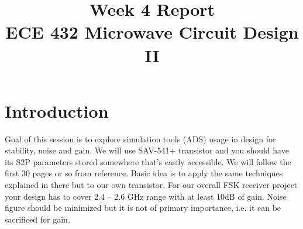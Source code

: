 \documentclass[conference]{IEEEtran}
\begin{document}
\title{Week 4 Report\\ECE 432 Microwave Circuit Design II}
\author{
\and
{}
}
\maketitle
\IEEEpeerreviewmaketitle
\section{Introduction}
Goal of this session is to explore simulation tools (ADS) usage in design for stability, noise and gain. We will use SAV-541+ transistor and you should have its S2P parameters stored somewhere that’s easily accessible. We will follow the first 30 pages or so from reference\cite{payne}. Basic idea is to apply the same techniques explained in there but to our own transistor. For our overall FSK receiver project your design has to cover 2.4 – 2.6 GHz range with at least 10dB of gain. Noise figure should be minimized but it is not of primary importance, i.e. it can be sacrificed for gain.
\end{document}
